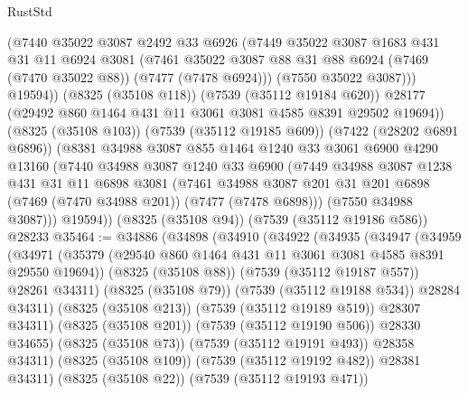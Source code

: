 \begin{lexlean}{RustStd}
\begin{coremodule}
            (@7440
              @35022
              @3087
              @2492
              @33
              @6926
              (@7449
                @35022
                @3087
                @1683
                @431
                @31
                @11
                @6924
                @3081
                (@7461
                  @35022
                  @3087
                  @88
                  @31
                  @88
                  @6924
                  (@7469 (@7470 @35022 @88))
                  (@7477 (@7478 @6924)))
                (@7550 @35022 @3087)))
            @19594))
        (@8325 (@35108 @118))
        (@7539 (@35112 @19184 @620))
        @28177
        (@29492 @860 @1464 @431 @11 @3061 @3081 @4585 @8391 @29502 @19694))
      (@8325 (@35108 @103))
      (@7539 (@35112 @19185 @609))
      (@7422 (@28202 @6891 @6896))
      (@8381
        @34988
        @3087
        @855
        @1464
        @1240
        @33
        @3061
        @6900
        @4290
        @13160
        (@7440
          @34988
          @3087
          @1240
          @33
          @6900
          (@7449
            @34988
            @3087
            @1238
            @431
            @31
            @11
            @6898
            @3081
            (@7461
              @34988
              @3087
              @201
              @31
              @201
              @6898
              (@7469 (@7470 @34988 @201))
              (@7477 (@7478 @6898)))
            (@7550 @34988 @3087)))
        @19594))
    (@8325 (@35108 @94))
    (@7539 (@35112 @19186 @586))
    @28233
@35464 := @34886
    (@34898
      (@34910
        (@34922
          (@34935
            (@34947
              (@34959
                (@34971
                  (@35379 (@29540 @860 @1464 @431 @11 @3061 @3081 @4585 @8391 @29550 @19694))
                  (@8325 (@35108 @88))
                  (@7539 (@35112 @19187 @557))
                  @28261
                  @34311)
                (@8325 (@35108 @79))
                (@7539 (@35112 @19188 @534))
                @28284
                @34311)
              (@8325 (@35108 @213))
              (@7539 (@35112 @19189 @519))
              @28307
              @34311)
            (@8325 (@35108 @201))
            (@7539 (@35112 @19190 @506))
            @28330
            @34655)
          (@8325 (@35108 @73))
          (@7539 (@35112 @19191 @493))
          @28358
          @34311)
        (@8325 (@35108 @109))
        (@7539 (@35112 @19192 @482))
        @28381
        @34311)
      (@8325 (@35108 @22))
      (@7539 (@35112 @19193 @471))

\end{coremodule}
\end{lexlean}
